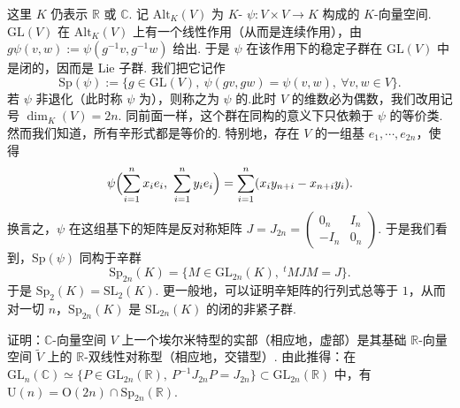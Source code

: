 \begin{numpara}[辛群]\label{np:lie-1-2-4}
这里 $K$ 仍表示 $\mathbb R$ 或 $\mathbb C$. 记 $\mathrm{Alt}_K(V)$ 为 $K$- $\psi:V\times V\to K$ 构成的 $K$-向量空间.$\mathrm{GL}(V)$ 在 $\mathrm{Alt}_K(V)$ 上有一个线性作用（从而是连续作用），由 $g\psi(v,w):=\psi(g^{-1}v,g^{-1}w)$ 给出. 于是 $\psi$ 在该作用下的稳定子群在 $\mathrm{GL}(V)$ 中是闭的，因而是 Lie 子群. 我们把它记作
\[
\mathrm{Sp}(\psi):=\{g\in\mathrm{GL}(V),\ \psi(gv,gw)=\psi(v,w),\ \forall v,w\in V\}.
\]
若 $\psi$ 非退化（此时称 $\psi$ 为），则称之为 $\psi$ 的.此时 $V$ 的维数必为偶数，我们改用记号 $\dim_K(V)=2n$. 同前面一样，这个群在同构的意义下只依赖于 $\psi$ 的等价类. 然而我们知道，所有辛形式都是等价的. 特别地，存在 $V$ 的一组基 $e_1,\cdots,e_{2n}$，使得
\[
\psi\Bigl(\sum_{i=1}^{n}x_ie_i,\ \sum_{i=1}^{n}y_ie_i\Bigr)=\sum_{i=1}^{n}(x_iy_{n+i}-x_{n+i}y_i).
\]
换言之，$\psi$ 在这组基下的矩阵是反对称矩阵 $J=J_{2n}=\begin{pmatrix}0_n & I_n\\ -I_n & 0_n\end{pmatrix}$. 于是我们看到，$\mathrm{Sp}(\psi)$ 同构于辛群
\[
\mathrm{Sp}_{2n}(K)=\{M\in\mathrm{GL}_{2n}(K),\ ^tMJM=J\}.
\]
于是 $\mathrm{Sp}_2(K)=\mathrm{SL}_2(K)$. 更一般地，可以证明辛矩阵的行列式总等于 $1$，从而对一切 $n$，$\mathrm{Sp}_{2n}(K)$ 是 $\mathrm{SL}_{2n}(K)$ 的闭的非紧子群.
\end{numpara}
\begin{exercise*}
证明：$\mathbb C$-向量空间 $V$ 上一个埃尔米特型的实部（相应地，虚部）是其基础 $\mathbb R$-向量空间 $\widetilde{V}$ 上的 $\mathbb R$-双线性对称型（相应地，交错型）. 由此推得：在 $\mathrm{GL}_n(\mathbb C)\simeq\{P\in\mathrm{GL}_{2n}(\mathbb R),\ P^{-1}J_{2n}P=J_{2n}\}\subset\mathrm{GL}_{2n}(\mathbb R)$ 中，有 $\mathrm{U}(n)=\mathrm{O}(2n)\cap\mathrm{Sp}_{2n}(\mathbb R)$.
\end{exercise*}
